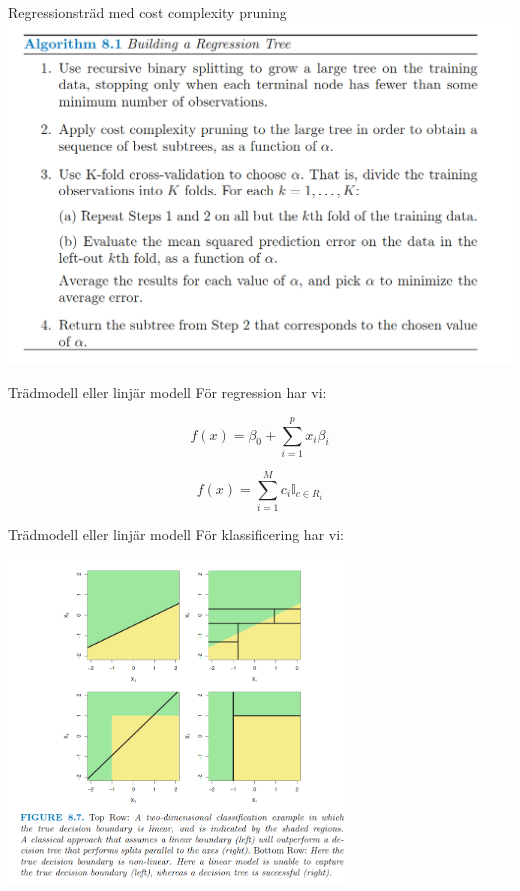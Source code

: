 \documentclass[10pt,english]{beamer}
\begin{document}
\begin{frame}{Regressionsträd med cost complexity pruning}
    \includegraphics[height=0.9\textheight]{figs/reg_tree_estimate.png}
\end{frame}

\begin{frame}{Trädmodell eller linjär modell}
    För regression har vi:

    \begin{equation*}
        f(x) = \beta_0 + \sum_{i=1}^{p} x_i \beta_i
    \end{equation*}

    \begin{equation*}
        f(x) = \sum_{i=1}^{M}c_i \mathbb{I}_{c \in R_i}
    \end{equation*}
\end{frame}

\begin{frame}{Trädmodell eller linjär modell}
    För klassificering har vi:

    \includegraphics[width=0.68\textwidth]{figs/trees_vs_linear.png}

\end{frame}
\end{document}
